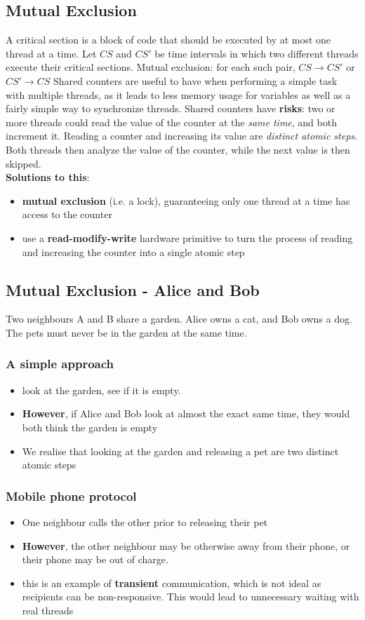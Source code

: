 \documentclass{article}
\begin{document}
\subsection{Mutual Exclusion}
A critical section is a block of code that should be executed by at most one thread at a time. 
\bigbreak Let $CS$ and $CS'$ be time intervals in which two different threads execute their critical sections.
\bigbreak Mutual exclusion: for each such pair, $CS \rightarrow CS'$ or $CS' \rightarrow CS$
\bigbreak Shared counters are useful to have when performing a simple task with multiple threads, as it leads to less memory usage for variables as well as a fairly simple way to synchronize threads. Shared counters have \textbf{risks}: two or more threads could read the value of the counter at the \textit{same time}, and both increment it. Reading a counter and increasing its value are \textit{distinct atomic steps}. Both threads then analyze the value of the counter, while the next value is then skipped.
\\\textbf{Solutions to this}:
\begin{itemize}
    \item \textbf{mutual exclusion} (i.e. a lock), guaranteeing only one thread at a time has access to the counter
    \item use a \textbf{read-modify-write} hardware primitive to turn the process of reading and increasing the counter into a single atomic step
\end{itemize}
\subsection{Mutual Exclusion - Alice and Bob}
Two neighbours A and B share a garden. Alice owns a cat, and Bob owns a dog. The pets must never be in the garden at the same time.
\subsubsection{A simple approach}
\begin{itemize}
    \item look at the garden, see if it is empty.
    \item \textbf{However}, if Alice and Bob look at almost the exact same time, they would both think the garden is empty
    \item We realise that looking at the garden and releasing a pet are two distinct atomic steps
\end{itemize}
\subsubsection{Mobile phone protocol}
\begin{itemize}
    \item One neighbour calls the other prior to releasing their pet
    \item \textbf{However}, the other neighbour may be otherwise away from their phone, or their phone may be out of charge. 
    \item this is an example of \textbf{transient} communication, which is not ideal as recipients can be non-responsive. This would lead to unnecessary waiting with real threads
\end{itemize}
\end{document}
